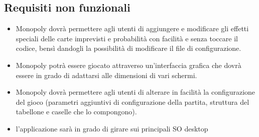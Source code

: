 \subsection{Requisiti non funzionali}
\begin{itemize}
    \item 
    Monopoly dovrà permettere agli utenti di aggiungere e 
    modificare gli effetti speciali delle carte imprevisti e probabilità
    con facilità e senza toccare il codice, bensì dandogli la possibilità di
    modificare il file di configurazione.
    \item Monopoly potrà essere giocato attraverso un'interfaccia grafica
    che dovrà essere in grado di adattarsi alle dimensioni di vari schermi.
    \item 
    Monopoly dovrà permettere agli utenti di alterare in facilità la 
    configurazione del gioco (parametri aggiuntivi di 
    configurazione della partita, struttura del tabellone e caselle che lo compongono).
    \item l'applicazione sarà in grado di girare sui principali SO desktop
\end{itemize}

